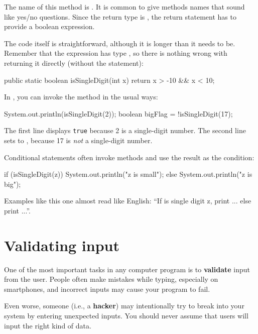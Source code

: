 The name of this method is .
It is common to give  methods names that sound like yes/no questions.
Since the return type is , the return statement has to provide a boolean expression.

The code itself is straightforward, although it is longer than it needs to be.
Remember that the expression  has type , so there is nothing wrong with returning it directly (without the  statement):

\begin{code}
public static boolean isSingleDigit(int x) {
    return x > -10 && x < 10;
}
\end{code}

In , you can invoke the method in the usual ways:

\begin{code}
System.out.println(isSingleDigit(2));
boolean bigFlag = !isSingleDigit(17);
\end{code}

The first line displays {\tt true} because 2 is a single-digit number.
The second line sets  to , because 17 is {\em not} a single-digit number.

Conditional statements often invoke  methods and use the result as the condition:

\begin{code}
if (isSingleDigit(z)) {
    System.out.println("z is small");
} else {
    System.out.println("z is big");
}
\end{code}

Examples like this one almost read like English:
``If is single digit z, print ... else print ...''.


\section{Validating input}
\label{validate}


One of the most important tasks in any computer program is to {\bf validate} input from the user.
People often make mistakes while typing, especially on smartphones, and incorrect inputs may cause your program to fail.

Even worse, someone (i.e., a {\bf hacker}) may intentionally try to break into your system by entering unexpected inputs.
You should never assume that users will input the right kind of data.

